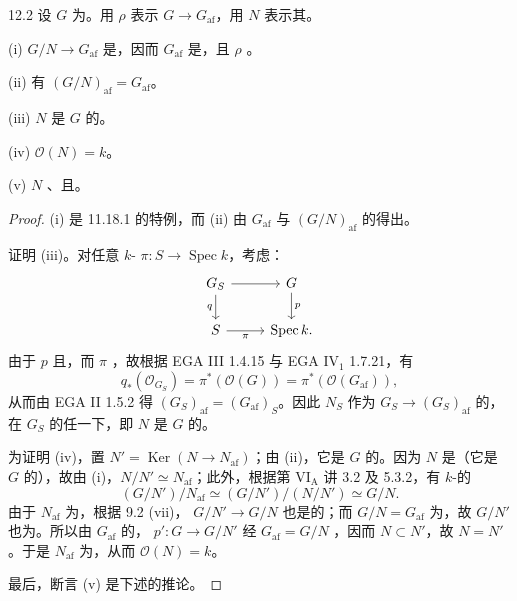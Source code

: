 \begin{SGAresult}{}{12.2}
设 $G$ 为。用 $\rho$ 表示 $G\to G_{\mathrm{af}}$，用 $N$ 表示其。

(i)  $G/N\to G_{\mathrm{af}}$ 是，因而 $G_{\mathrm{af}}$ 是，且 $\rho$ 。

(ii) 有 $(G/N)_{\mathrm{af}}=G_{\mathrm{af}}$。

(iii) $N$ 是 $G$ 的。

(iv) $\mathcal O(N)=k$。

(v) $N$ 、且。
\end{SGAresult}
\begin{proof}
(i) 是 11.18.1 的特例，而 (ii) 由 $G_{\mathrm{af}}$ 与 $(G/N)_{\mathrm{af}}$ 的得出。

证明 (iii)。对任意 $k$- $\pi:S\to\operatorname{Spec}k$，考虑：
\[
\begin{tikzcd}
G_S \arrow[r] \arrow[d,"q"'] & G \arrow[d,"p"]\\
S \arrow[r,"\pi"'] & \operatorname{Spec}k .
\end{tikzcd}
\]
由于 $p$ 且，而 $\pi$ ，故根据 EGA III 1.4.15 与 EGA IV$_1$ 1.7.21，有
\[
q_*(\mathcal O_{G_S})=\pi^*(\mathcal O(G))=\pi^*(\mathcal O(G_{\mathrm{af}})),
\]
从而由 EGA II 1.5.2 得 $(G_S)_{\mathrm{af}}=(G_{\mathrm{af}})_S$。因此 $N_S$ 作为 $G_S\to(G_S)_{\mathrm{af}}$ 的，在 $G_S$ 的任一下，即 $N$ 是 $G$ 的。

为证明 (iv)，置 $N'=\operatorname{Ker}(N\to N_{\mathrm{af}})$；由 (ii)，它是 $G$ 的。因为 $N$ 是（它是 $G$ 的），故由 (i)，$N/N'\simeq N_{\mathrm{af}}$；此外，根据第 VI$_{\mathrm A}$ 讲 3.2 及 5.3.2，有 $k$-的
\[
(G/N')/N_{\mathrm{af}}\simeq(G/N')/(N/N')\simeq G/N.
\]
由于 $N_{\mathrm{af}}$ 为，根据 9.2 (vii)， $G/N'\to G/N$ 也是的；而 $G/N=G_{\mathrm{af}}$ 为，故 $G/N'$ 也为。所以由 $G_{\mathrm{af}}$ 的， $p':G\to G/N'$ 经 $G_{\mathrm{af}}=G/N$ ，因而 $N\subset N'$，故 $N=N'$。于是 $N_{\mathrm{af}}$ 为，从而 $\mathcal O(N)=k$。

最后，断言 (v) 是下述的推论。
\end{proof}

